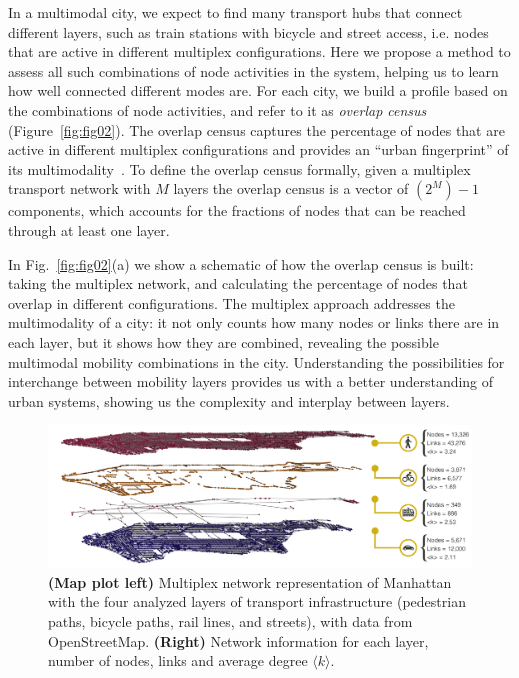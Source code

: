 In a multimodal city, we expect to find many transport hubs that connect different layers, such as train stations with bicycle and street access, i.e. nodes that are active in different multiplex configurations. Here we propose a method to assess all such combinations of node activities in the system, helping us to learn how well connected different modes are. For each city, we build a profile based on the combinations of node activities, and refer to it as \emph{overlap census} (Figure~\ref{fig:fig02}). The overlap census captures the percentage of nodes that are active in different multiplex configurations and provides an ``urban fingerprint'' of its multimodality~\cite{Aleta2017Multilayer}. To define the overlap census formally, given a multiplex transport network with $M$ layers the overlap census is a vector of $(2^M)-1$ components, which accounts for the fractions of nodes that can be reached through at least one layer.

In Fig.~\ref{fig:fig02}(a) we show a schematic of how the overlap census is built: taking the multiplex network, and calculating the percentage of nodes that overlap in different configurations. The multiplex approach addresses the multimodality of a city: it not only counts how many nodes or links there are in each layer, but it shows how they are combined, revealing the possible multimodal mobility combinations in the city. Understanding the possibilities for interchange between mobility layers provides us with a better understanding of urban systems, showing us the complexity and interplay between layers.

\begin{figure}[t!]
	\centering
	\includegraphics[width=\textwidth]{images/multiplex/Multilayer_NY_op2.png}
	\caption{\textbf{(Map plot left)} Multiplex network representation of Manhattan with the four analyzed layers of transport infrastructure (pedestrian paths, bicycle paths, rail lines, and streets), with data from OpenStreetMap. \textbf{(Right)} Network information for each layer, number of nodes, links and average degree $\langle k \rangle$.}
	\label{fig:fig01}
\end{figure}


